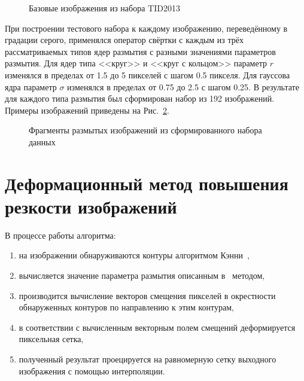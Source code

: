 \begin{figure}[ht]
	\caption{Базовые изображения из набора TID2013}
	\label{fig:tid2013-db}
\end{figure}

При построении тестового набора к каждому изображению, переведённому в градации серого, применялся оператор свёртки с каждым из трёх рассматриваемых типов ядер размытия с разными значениями параметров размытия. Для ядер типа <<круг>> и <<круг с кольцом>> параметр $r$ изменялся в пределах от 1.5 до 5 пикселей с шагом 0.5 пикселя. Для гауссова ядра параметр $\sigma$ изменялся в пределах от 0.75 до 2.5 с шагом 0.25.
В результате для каждого типа размытия был сформирован набор из 192 изображений. Примеры изображений приведены на Рис.~\ref{fig:blurry-examples}.

\begin{figure}[ht]
	\caption{Фрагменты размытых изображений из сформированного набора данных}
	\label{fig:blurry-examples}
\end{figure}


\section{Деформационный метод повышения резкости изображений}

В процессе работы алгоритма:
\begin{enumerate}[beginpenalty=10000]
	\item на изображении обнаруживаются контуры алгоритмом Кэнни~\cite{canny1986computational},
	\item вычисляется значение параметра размытия описанным в~\cite{nasonov2015edge} методом,
	\item производится вычисление векторов смещения пикселей в окрестности обнаруженных контуров по направлению к этим контурам,
	\item в соответствии с вычисленным векторным полем смещений деформируется пиксельная сетка,
	\item полученный результат проецируется на равномерную сетку выходного изображения с помощью интерполяции.
\end{enumerate}

